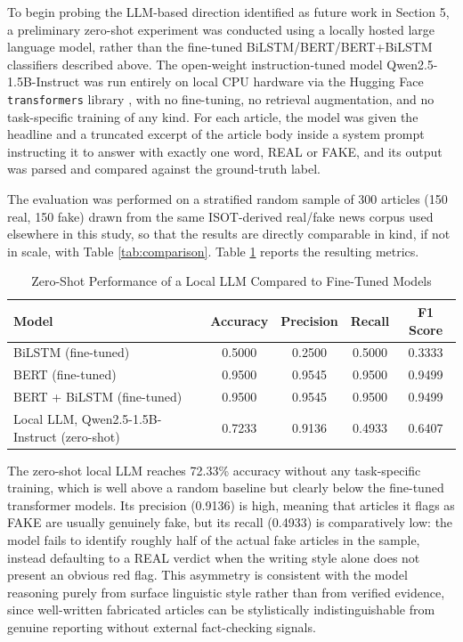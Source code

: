 \documentclass[runningheads]{llncs}
\begin{document}
To begin probing the LLM-based direction identified as future work in Section 5, a preliminary zero-shot experiment was conducted using a locally hosted large language model, rather than the fine-tuned BiLSTM/BERT/BERT+BiLSTM classifiers described above. The open-weight instruction-tuned model Qwen2.5-1.5B-Instruct \cite{Yang2024Qwen25} was run entirely on local CPU hardware via the Hugging Face \texttt{transformers} library \cite{Wolf2020Transformers}, with no fine-tuning, no retrieval augmentation, and no task-specific training of any kind. For each article, the model was given the headline and a truncated excerpt of the article body inside a system prompt instructing it to answer with exactly one word, REAL or FAKE, and its output was parsed and compared against the ground-truth label.

The evaluation was performed on a stratified random sample of 300 articles (150 real, 150 fake) drawn from the same ISOT-derived real/fake news corpus \cite{ISOTDataset} used elsewhere in this study, so that the results are directly comparable in kind, if not in scale, with Table \ref{tab:comparison}. Table \ref{tab:llm-comparison} reports the resulting metrics.

\begin{table}[H]
\centering
\caption{Zero-Shot Performance of a Local LLM Compared to Fine-Tuned Models}
\label{tab:llm-comparison}
\small
\begin{tabular}{|l|c|c|c|c|}
\hline
\textbf{Model} & \textbf{Accuracy} & \textbf{Precision} & \textbf{Recall} & \textbf{F1 Score} \\ \hline
BiLSTM (fine-tuned) & 0.5000 & 0.2500 & 0.5000 & 0.3333 \\
BERT (fine-tuned) & 0.9500 & 0.9545 & 0.9500 & 0.9499 \\
BERT + BiLSTM (fine-tuned) & 0.9500 & 0.9545 & 0.9500 & 0.9499 \\
Local LLM, Qwen2.5-1.5B-Instruct (zero-shot) & 0.7233 & 0.9136 & 0.4933 & 0.6407 \\ \hline
\end{tabular}
\end{table}

The zero-shot local LLM reaches 72.33\% accuracy without any task-specific training, which is well above a random baseline but clearly below the fine-tuned transformer models. Its precision (0.9136) is high, meaning that articles it flags as FAKE are usually genuinely fake, but its recall (0.4933) is comparatively low: the model fails to identify roughly half of the actual fake articles in the sample, instead defaulting to a REAL verdict when the writing style alone does not present an obvious red flag. This asymmetry is consistent with the model reasoning purely from surface linguistic style rather than from verified evidence, since well-written fabricated articles can be stylistically indistinguishable from genuine reporting without external fact-checking signals.
\end{document}
